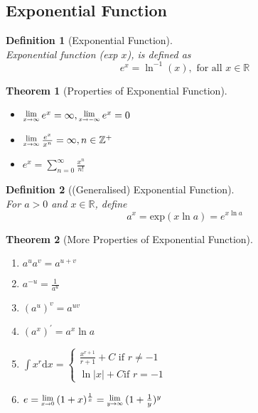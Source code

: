 \documentclass[12pt]{article}
\newcommand{\diff}{\mathrm{d}}
\newcommand{\Lim}[1]{\raisebox{0.5ex}{\scalebox{0.8}{$\displaystyle \lim_{#1}\;$}}}
\newtheorem{definition}{Definition}[section]
\newtheorem{theorem}{Theorem}[section]
\theoremstyle{definition}
\begin{document}
\subsection{Exponential Function}
\begin{definition}[Exponential Function]
\hfill\\
\normalfont Exponential function (exp $x$), is defined as
\[
e^x=\ln ^{-1}(x), \text{ for all }x\in \mathbb{R}
\]
\end{definition}
\begin{theorem}[Properties of Exponential Function]
\begin{itemize}
\item $\Lim{x\to\infty}e^x=\infty, \Lim{x\to-\infty}e^x=0$
\item $\Lim{x\to\infty} \frac{e^{x}}{x^{n}}=\infty, n\in \mathbb{Z}^{+}$
\item $e^x = \sum^{\infty}_{n=0}\frac{x^n}{n!}$
\end{itemize}
\end{theorem}
\begin{definition}[(Generalised) Exponential Function]
\hfill\\
\normalfont For $a>0$ and $x\in \mathbb{R}$, define
\[
a^x=\text{exp}(x\ln a) = e^{x\ln a}\]
\end{definition}
\begin{theorem}[More Properties of Exponential Function]
\hfill\\
\normalfont
\begin{enumerate}
\item $a^u a^v = a^{u+v}$
\item $a^{-u}=\frac{1}{a^u}$
\item $(a^u)^v=a^{uv}$
\item $(a^x)^\prime = a^x \ln a$
\item $\int x^r \diff x = \begin{cases}
								\frac{x^{r+1}}{r+1}+C \text{ if }r\neq -1\\
								\ln|x| +C \text{if }r=-1
								\end{cases}$
\item $e = \Lim{x\to 0}(1+x)^{\frac{1}{x}} = \Lim{y\to\infty}(1+\frac{1}{y})^y$
\end{enumerate}
\end{theorem}
\end{document}
